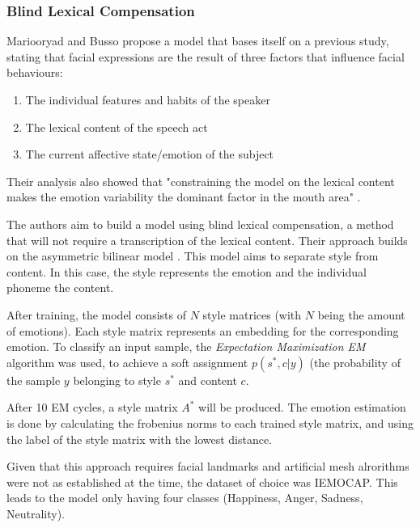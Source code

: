 \subsubsection{Blind Lexical Compensation}
Mariooryad and Busso \cite{mariooryad2015facial} propose a model that bases itself on a previous study, stating that facial expressions are the result of three factors that influence facial behaviours:

\begin{enumerate}
    \item The individual features and habits of the speaker
    \item The lexical content of the speech act
    \item The current affective state/emotion of the subject
\end{enumerate}

Their analysis also showed that "constraining the model on the lexical content makes the emotion variability the dominant factor in the mouth area" \cite{mariooryad2015facial} \cite{mariooryad2012factorizing}.

The authors aim to build a model using blind lexical compensation, a method that will not require a transcription of the lexical content. Their approach builds on the asymmetric bilinear model \cite{tenenbaum1997separating} \cite{tenenbaum2000separating}. This model aims to separate style from content. In this case, the style represents the emotion and the individual phoneme the content.

After training, the model consists of $N$ style matrices (with $N$ being the amount of emotions). Each style matrix represents an embedding for the corresponding emotion. To classify an input sample, the \emph{Expectation Maximization EM} algorithm was used, to achieve a soft assignment $p(s^{*}, c |y)$ (the probability of the sample $y$ belonging to style $s^{*}$ and content $c$.

After 10 EM cycles, a style matrix $A^{*}$ will be produced. The emotion estimation is done by calculating the frobenius norms to each trained style matrix, and using the label of the style matrix with the lowest distance.

Given that this approach requires facial landmarks and artificial mesh alrorithms were not as established at the time, the dataset of choice was IEMOCAP. This leads to the model only having four classes (Happiness, Anger, Sadness, Neutrality).

